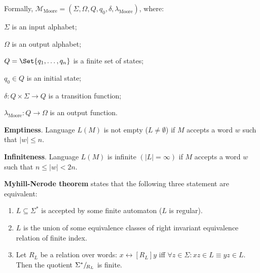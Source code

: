\documentclass[a4paper,10pt]{article}
\begin{document}
\begin{terms}
\begin{minipage}{\linewidth}
    Formally, $\mathcal{M}_\text{Moore} = (\Sigma, \Omega, Q, q_0, \delta, \lambda_\text{Moore})$, where:

    \begin{terms}
        \item $\Sigma$ is an input alphabet;

        \item $\Omega$ is an output alphabet;

        \item $Q = \Set{q_1, \dots, q_n}$ is a finite set of states;

        \item $q_0 \in Q$ is an initial state;

        \item $\delta \colon Q \times \Sigma \to Q$ is a transition function;

        \item $\lambda_\text{Moore} \colon Q \to \Omega$ is an output function.
    \end{terms}

    \end{minipage}

    \item \textbf{Emptiness}.
    Language $L(M)$ is not empty ($L \neq \emptyset$) if $M$ accepts a word $w$ such that $|w| \leq n$.

    \item \textbf{Infiniteness}.
    Language $L(M)$ is infinite $(|L| = \infty)$ if $M$ accepts a word $w$ such that $n \leq |w| < 2n$.

    \item \textbf{Myhill-Nerode theorem} states that the following three statement are equivalent:

    \begin{enumerate}
        \item $L \subseteq \Sigma^*$ is accepted by some finite automaton ($L$ is regular).

        \item $L$ is the union of some equivalence classes of right invariant equivalence relation of finite index.

        \item Let $R_L$ be a relation over words: $x \rel[R_L] y$ iff $\forall z \in \Sigma : xz \in L \equiv yz \in L$.
        Then the quotient $\quotient[R_L]{\Sigma^*}$ is finite.
    \end{enumerate}


\end{terms}
\end{document}
